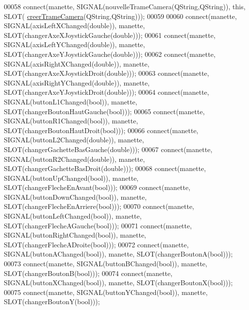 \begin{DoxyCode}
00058     connect(manette, SIGNAL(nouvelleTrameCamera(QString,QString)), \textcolor{keyword}{this}, SLOT(
      \hyperlink{class_rov_a204b1f4efe5a89f4458d84e17858e7c8}{creerTrameCamera}(QString,QString)));
00059 
00060     connect(manette, SIGNAL(axisLeftXChanged(\textcolor{keywordtype}{double})), manette, SLOT(changerAxeXJoystickGauche(\textcolor{keywordtype}{double})));
00061     connect(manette, SIGNAL(axisLeftYChanged(\textcolor{keywordtype}{double})), manette, SLOT(changerAxeYJoystickGauche(\textcolor{keywordtype}{double})));
00062     connect(manette, SIGNAL(axisRightXChanged(\textcolor{keywordtype}{double})), manette, SLOT(changerAxeXJoystickDroit(\textcolor{keywordtype}{double})));
00063     connect(manette, SIGNAL(axisRightYChanged(\textcolor{keywordtype}{double})), manette, SLOT(changerAxeYJoystickDroit(\textcolor{keywordtype}{double})));
00064     connect(manette, SIGNAL(buttonL1Changed(\textcolor{keywordtype}{bool})), manette, SLOT(changerBoutonHautGauche(\textcolor{keywordtype}{bool})));
00065     connect(manette, SIGNAL(buttonR1Changed(\textcolor{keywordtype}{bool})), manette, SLOT(changerBoutonHautDroit(\textcolor{keywordtype}{bool})));
00066     connect(manette, SIGNAL(buttonL2Changed(\textcolor{keywordtype}{double})), manette, SLOT(changerGachetteBasGauche(\textcolor{keywordtype}{double})));
00067     connect(manette, SIGNAL(buttonR2Changed(\textcolor{keywordtype}{double})), manette, SLOT(changerGachetteBasDroit(\textcolor{keywordtype}{double})));
00068     connect(manette, SIGNAL(buttonUpChanged(\textcolor{keywordtype}{bool})), manette, SLOT(changerFlecheEnAvant(\textcolor{keywordtype}{bool})));
00069     connect(manette, SIGNAL(buttonDownChanged(\textcolor{keywordtype}{bool})), manette, SLOT(changerFlecheEnArriere(\textcolor{keywordtype}{bool})));
00070     connect(manette, SIGNAL(buttonLeftChanged(\textcolor{keywordtype}{bool})), manette, SLOT(changerFlecheAGauche(\textcolor{keywordtype}{bool})));
00071     connect(manette, SIGNAL(buttonRightChanged(\textcolor{keywordtype}{bool})), manette, SLOT(changerFlecheADroite(\textcolor{keywordtype}{bool})));
00072     connect(manette, SIGNAL(buttonAChanged(\textcolor{keywordtype}{bool})), manette, SLOT(changerBoutonA(\textcolor{keywordtype}{bool})));
00073     connect(manette, SIGNAL(buttonBChanged(\textcolor{keywordtype}{bool})), manette, SLOT(changerBoutonB(\textcolor{keywordtype}{bool})));
00074     connect(manette, SIGNAL(buttonXChanged(\textcolor{keywordtype}{bool})), manette, SLOT(changerBoutonX(\textcolor{keywordtype}{bool})));
00075     connect(manette, SIGNAL(buttonYChanged(\textcolor{keywordtype}{bool})), manette, SLOT(changerBoutonY(\textcolor{keywordtype}{bool})));

\end{DoxyCode}
